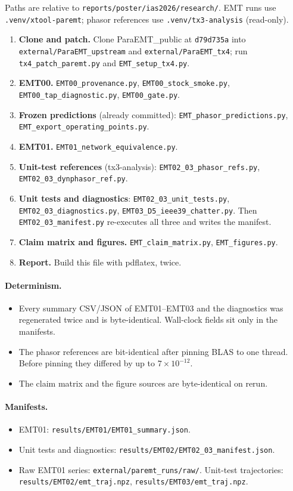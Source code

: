 \documentclass[10pt,a4paper]{article}
\newcommand{\f}[1]{\nolinkurl{#1}}
\begin{document}
Paths are relative to \f{reports/poster/ias2026/research/}. EMT runs use
\f{.venv/xtool-paremt}; phasor references use \f{.venv/tx3-analysis}
(read-only).
\begin{enumerate}
\item \textbf{Clone and patch.} Clone ParaEMT\_public at \texttt{d79d735a}
  into \f{external/ParaEMT_upstream} and \f{external/ParaEMT_tx4}; run
  \f{tx4_patch_paremt.py} and \f{EMT_setup_tx4.py}.
\item \textbf{EMT00.} \f{EMT00_provenance.py}, \f{EMT00_stock_smoke.py},
  \f{EMT00_tap_diagnostic.py}, \f{EMT00_gate.py}.
\item \textbf{Frozen predictions} (already committed):
  \f{EMT_phasor_predictions.py}, \f{EMT_export_operating_points.py}.
\item \textbf{EMT01.} \f{EMT01_network_equivalence.py}.
\item \textbf{Unit-test references} (tx3-analysis): \f{EMT02_03_phasor_refs.py},
  \f{EMT02_03_dynphasor_ref.py}.
\item \textbf{Unit tests and diagnostics}: \f{EMT02_03_unit_tests.py},
  \f{EMT02_03_diagnostics.py}, \f{EMT03_D5_ieee39_chatter.py}. Then
  \f{EMT02_03_manifest.py} re-executes all three and writes the manifest.
\item \textbf{Claim matrix and figures.} \f{EMT_claim_matrix.py},
  \f{EMT_figures.py}.
\item \textbf{Report.} Build this file with pdflatex, twice.
\end{enumerate}

\paragraph{Determinism.}
\begin{itemize}
\item Every summary CSV/JSON of EMT01--EMT03 and the diagnostics was
  regenerated twice and is byte-identical. Wall-clock fields sit only in the
  manifests.
\item The phasor references are bit-identical after pinning BLAS to one
  thread. Before pinning they differed by up to $7\times10^{-12}$.
\item The claim matrix and the figure sources are byte-identical on rerun.
\end{itemize}

\paragraph{Manifests.}
\begin{itemize}
\item EMT01: \f{results/EMT01/EMT01_summary.json}.
\item Unit tests and diagnostics: \f{results/EMT02/EMT02_03_manifest.json}.
\item Raw EMT01 series: \f{external/paremt_runs/raw/}. Unit-test trajectories:
  \f{results/EMT02/emt_traj.npz}, \f{results/EMT03/emt_traj.npz}.
\end{itemize}
\end{document}
